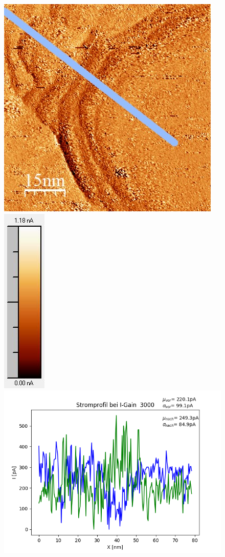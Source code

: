 \documentclass[12pt,a4paper]{article}
\begin{document}
\begin{figure}[H]
\includegraphics[scale=0.6]{Bilder/Anhang/IGain/Strom/3000_IGain_Strom_nach.jpg}
\includegraphics[scale=0.6]{Bilder/Anhang/IGain/Strom/3000_IGain_Strom_nach_Skala.jpg}
\includegraphics[scale=0.5]{Bilder/Anhang/IGain/Strom/Strom_Profil_IGain_3000.png}

\end{figure}
\end{document}
